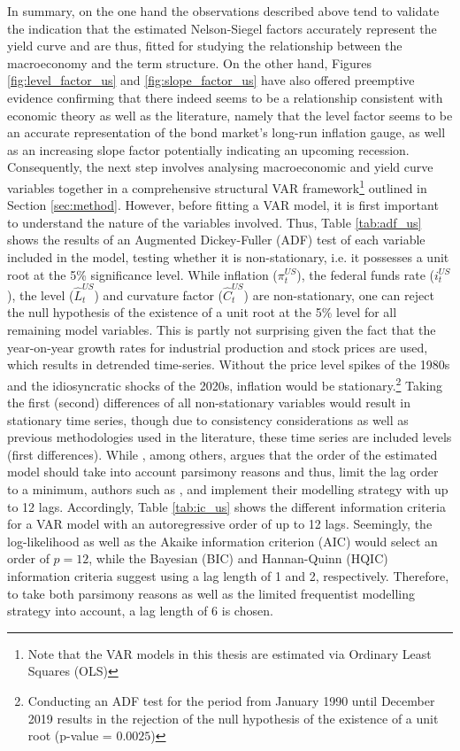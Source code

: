 In summary, on the one hand the observations described above tend to validate the indication that the estimated Nelson-Siegel factors accurately represent the yield curve and are thus, fitted for studying the relationship between the macroeconomy and the term structure. On the other hand, Figures \ref{fig:level_factor_us} and \ref{fig:slope_factor_us} have also offered preemptive evidence confirming that there indeed seems to be a relationship consistent with economic theory as well as the literature, namely that the level factor seems to be an accurate representation of the bond market's long-run inflation gauge, as well as an increasing slope factor potentially indicating an upcoming recession.
Consequently, the next step involves analysing macroeconomic and yield curve variables together in a comprehensive structural VAR framework\footnote{Note that the VAR models in this thesis are estimated via Ordinary Least Squares (OLS)} outlined in Section \ref{sec:method}. 
However, before fitting a VAR model, it is first important to understand the nature of the variables involved. Thus, Table \ref{tab:adf_us} shows the results of an Augmented Dickey-Fuller (ADF) test of each variable included in the model, testing whether it is non-stationary, i.e. it possesses a unit root at the 5\% significance level. 
While inflation ($\pi^{US}_{t}$), the federal funds rate ($i^{US}_{t}$), the level ($\hat{L}^{US}_{t}$) and curvature factor ($\hat{C}^{US}_{t}$) are non-stationary, one can reject the null hypothesis of the existence of a unit root at the 5\% level for all remaining model variables. 
This is partly not surprising given the fact that the year-on-year growth rates for industrial production and stock prices are used, which results in detrended time-series. 
Without the price level spikes of the 1980s and the idiosyncratic shocks of the 2020s, inflation would be stationary.\footnote{Conducting an ADF test for the period from January 1990 until December 2019 results in the rejection of the null hypothesis of the existence of a unit root (p-value = $0.0025$)}
Taking the first (second) differences of all non-stationary variables would result in stationary time series, though due to consistency considerations as well as previous methodologies used in the literature, these time series are included levels (first differences). 
While \citet{morales2010real}, among others, argues that the order of the estimated model should take into account parsimony reasons and thus, limit the lag order to a minimum, authors such as \citet{evans1998monetary}, \citet{ang2003no} and \citet{ang2006does} implement their modelling strategy with up to 12 lags. 
Accordingly, Table \ref{tab:ic_us} shows the different information criteria for a VAR model with an autoregressive order of up to 12 lags. Seemingly, the log-likelihood as well as the Akaike information criterion (AIC) would select an order of $p=12$, while the Bayesian (BIC) and Hannan-Quinn (HQIC) information criteria suggest using a lag length of 1 and 2, respectively. 
Therefore, to take both parsimony reasons as well as the limited frequentist modelling strategy into account, a lag length of 6 is chosen. 

